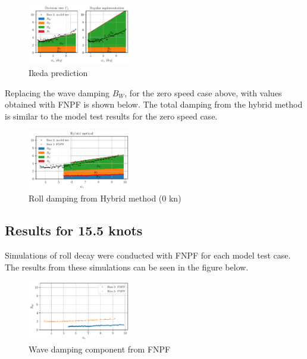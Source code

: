     \begin{figure}[h]
        \begin{center}
        \includegraphics[width = 0.4\textwidth]{figures/ikeda.pdf}
        \end{center}
        \vspace{-1cm}
        \caption{Ikeda prediction}
        \label{fig:ikeda}
    \end{figure}
    
Replacing the wave damping $B_W$, for the zero speed case above, with values obtained with FNPF is shown below. The total damping from the hybrid method is similar to the model test results for the zero speed case. 

    \begin{figure}[H]
        \begin{center}\includegraphics[width = 0.4\textwidth]{figures/hybrid_0.pdf}
        \end{center}
        \vspace{-1cm}
        \caption{Roll damping from Hybrid method (0 kn)}
        \label{fig:hybrid_0}
    \end{figure}   


\subsection*{Results for 15.5 knots}\label{knots}

Simulations of roll decay were conducted with FNPF for each model test case. The results from these simulations can be seen in the figure below.

    \begin{figure}[H]
        \begin{center}
        \includegraphics[width = 0.4\textwidth]{figures/fnpf.pdf}
        \end{center}
        \vspace{-1cm}
        \caption{Wave damping component from FNPF}
        \label{fig:fnpf}
    \end{figure}
    
